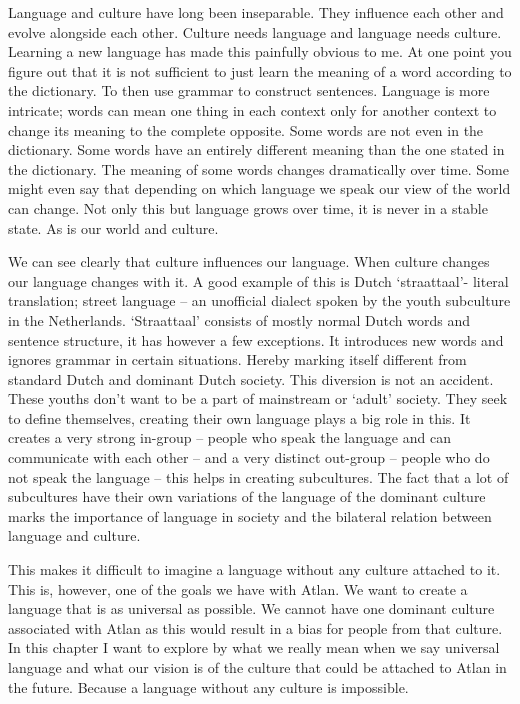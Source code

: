 
\noindent Language and culture have long been inseparable. They influence each other and evolve alongside each other. Culture needs language and language needs culture. Learning a new language has made this painfully obvious to me. At one point you figure out that it is not sufficient to just learn the meaning of a word according to the dictionary. To then use grammar to construct sentences. Language is more intricate; words can mean one thing in each context only for another context to change its meaning to the complete opposite. Some words are not even in the dictionary. Some words have an entirely different meaning than the one stated in the dictionary. The meaning of some words changes dramatically over time. Some might even say that depending on which language we speak our view of the world can change. Not only this but language grows over time, it is never in a stable state. As is our world and culture.  

We can see clearly that culture influences our language. When culture changes our language changes with it. A good example of this is Dutch ‘straattaal’- literal translation; street language – an unofficial dialect spoken by the youth subculture in the Netherlands. ‘Straattaal’ consists of mostly normal Dutch words and sentence structure, it has however a few exceptions. It introduces new words and ignores grammar in certain situations. Hereby marking itself different from standard Dutch and dominant Dutch society. This diversion is not an accident. These youths don’t want to be a part of mainstream or ‘adult’ society. They seek to define themselves, creating their own language plays a big role in this. It creates a very strong in-group – people who speak the language and can communicate with each other – and a very distinct out-group – people who do not speak the language – this helps in creating subcultures. The fact that a lot of subcultures have their own variations of the language of the dominant culture marks the importance of language in society and the bilateral relation between language and culture.  

This makes it difficult to imagine a language without any culture attached to it. This is, however, one of the goals we have with Atlan. We want to create a language that is as universal as possible. We cannot have one dominant culture associated with Atlan as this would result in a bias for people from that culture. In this chapter I want to explore by what we really mean when we say universal language and what our vision is of the culture that could be attached to Atlan in the future. Because a language without any culture is impossible.  

